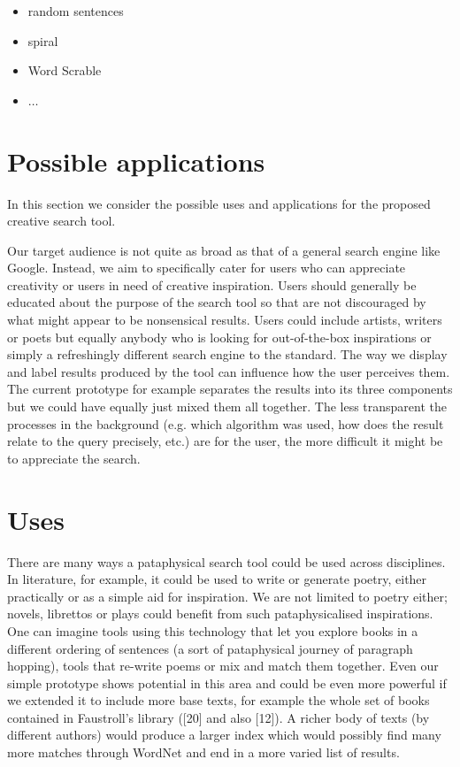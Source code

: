 \begin{itemize}
  \item random sentences
  \item spiral
  \item Word Scrable
  \item $\dots$
\end{itemize}

\section{Possible applications}

In this section we consider the possible uses and applications for the proposed creative search tool.

Our target audience is not quite as broad as that of a general search engine like Google. Instead, we aim to specifically cater for users who can appreciate creativity or users in need of creative inspiration. Users should generally be educated about the purpose of the search tool so that are not discouraged by what might appear to be nonsensical results. Users could include artists, writers or poets but equally anybody who is looking for out-of-the-box inspirations or simply a refreshingly different search engine to the standard.
The way we display and label results produced by the tool can influence how the user perceives them. The current prototype for example separates the results into its three components but we could have equally just mixed them all together. The less transparent the processes in the background (e.g. which algorithm was used, how does the result relate to the query precisely, etc.) are for the user, the more difficult it might be to appreciate the search.

\section{Uses}

There are many ways a pataphysical search tool could be used across disciplines.
In literature, for example, it could be used to write or generate poetry, either practically or as a simple aid for inspiration. We are not limited to poetry either; novels, librettos or plays could benefit from such pataphysicalised inspirations. One can imagine tools using this technology that let you explore books in a different ordering of sentences (a sort of pataphysical journey of paragraph hopping), tools that re-write poems or mix and match them together. Even our simple prototype shows potential in this area and could be even more powerful if we extended it to include more base texts, for example the whole set of books contained in Faustroll’s library ([20] and also [12]). A richer body of texts (by different authors) would produce a larger index which would possibly find many more matches through WordNet and end in a more varied list of results.

